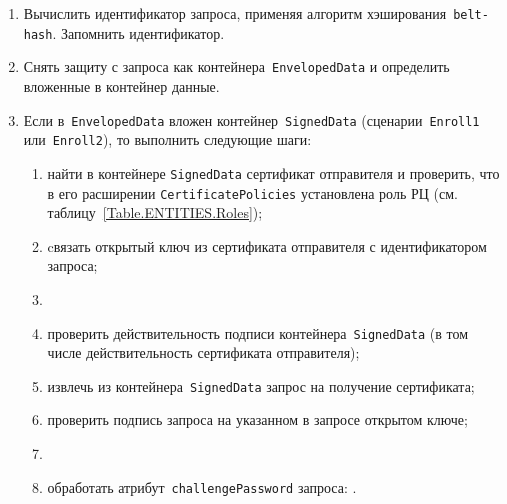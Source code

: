 \begin{enumerate}
\item
Вычислить идентификатор запроса, применяя 
алгоритм хэширования~\texttt{belt-hash}. 
Запомнить идентификатор.

\item
Снять защиту с запроса как контейнера~\texttt{EnvelopedData} 
и определить вложенные в контейнер данные.

\item
Если в~\texttt{EnvelopedData} вложен контейнер~\texttt{SignedData}
(сценарии~\texttt{Enroll1} или~\texttt{Enroll2}), 
то выполнить следующие шаги:

\begin{enumerate}
\item
найти в контейнере \texttt{SignedData} сертификат отправителя
и проверить, что в его расширении \texttt{CertificatePolicies} 
установлена роль РЦ (см. таблицу~\ref{Table.ENTITIES.Roles});
\item
cвязать открытый ключ из сертификата отправителя с идентификатором 
запроса;
\item                                                    
{}
\item
проверить действительность подписи контейнера~\texttt{SignedData}
(в том числе действительность сертификата отправителя);
\item
извлечь из контейнера~\texttt{SignedData} запрос на получение сертификата;
\item
проверить подпись запроса на указанном в запросе открытом ключе;
\item
{}
\item
обработать атрибут~\texttt{challengePassword} запроса:
.
\end{enumerate}


\end{enumerate}
